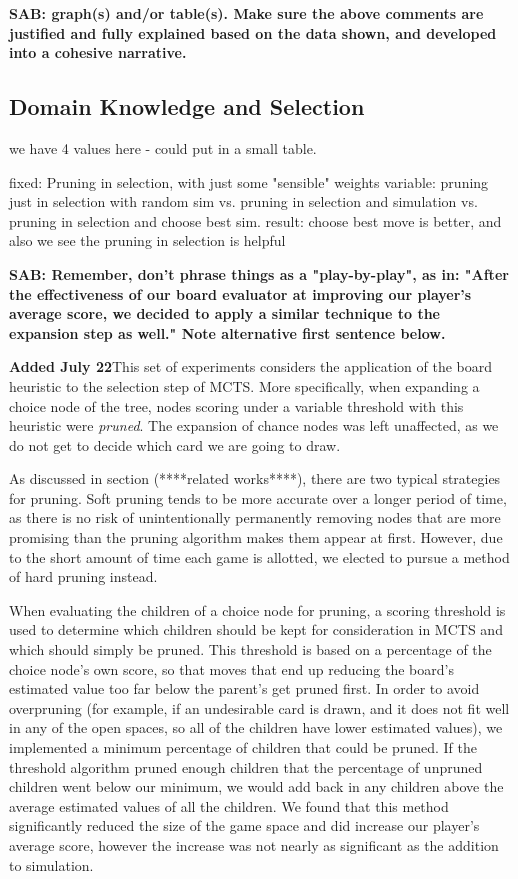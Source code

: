 \documentclass[letterpaper]{article}
\begin{document}
{\bf SAB: graph(s) and/or table(s). Make sure the above comments are justified and fully explained based on the data shown, and developed into a cohesive narrative.}

\subsection{Domain Knowledge and Selection}

we have 4 values here - could put in a small table.

fixed: Pruning in selection, with just some "sensible" weights
variable: pruning just in selection with random sim vs. pruning in selection and simulation vs. pruning in selection and choose best sim.
result: choose best move is better, and also we see the pruning in selection is helpful

{\bf SAB: Remember, don't phrase things as a "play-by-play", as in: "After the effectiveness of our board evaluator at improving our player’s average score, we decided to apply a similar technique to the expansion step as well." Note alternative first sentence below.}

{\bf Added July 22}This set of experiments considers the application of the board heuristic to the selection step of MCTS. More specifically, when expanding a choice node of the tree, nodes scoring under a variable threshold with this heuristic were {\it pruned}. The expansion of chance nodes was left unaffected, as we do not get to decide which card we are going to draw. 

As discussed in section (****related works****), there are two typical strategies for pruning. Soft pruning tends to be more accurate over a longer period of time, as there is no risk of unintentionally permanently removing nodes that are more promising than the pruning algorithm makes them appear at first. However, due to the short amount of time each game is allotted, we elected to pursue a method of hard pruning instead.

When evaluating the children of a choice node for pruning, a scoring threshold is used to determine which children should be kept for consideration in MCTS and which should simply be pruned. This threshold is based on a percentage of the choice node's own score, so that moves that end up reducing the board's estimated value too far below the parent's get pruned first. In order to avoid overpruning (for example, if an undesirable card is drawn, and it does not fit well in any of the open spaces, so all of the children have lower estimated values), we implemented a minimum percentage of children that could be pruned. If the threshold algorithm pruned enough children that the percentage of unpruned children  went below our minimum, we would add back in any children above the average estimated values of all the children. We found that this method significantly reduced the size of the game space and did increase our player's average score, however the increase was not nearly as significant as the addition to simulation.
\end{document}
